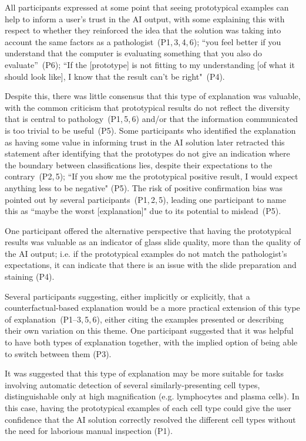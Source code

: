 \documentclass[final,5p,times,twocolumn,hyphens]{elsarticle}
\begin{document}
All participants expressed at some point that seeing prototypical examples can help to inform a user's trust in the AI output, with some explaining this with respect to whether they reinforced the idea that the solution was taking into account the same factors as a pathologist~(P1,\,3,\,4,\,6); “you feel better if you understand that the computer is evaluating something that you also do evaluate”~(P6); ``If the [prototype] is not fitting to my understanding [of what it should look like], I know that the result can't be right"~(P4). 

Despite this, there was little consensus that this type of explanation was valuable, with the common criticism that prototypical results do not reflect the diversity that is central to pathology~(P1,\,5,\,6) and/or that the information communicated is too trivial to be useful~(P5). Some participants who identified the explanation as having some value in informing trust in the AI solution later retracted this statement after identifying that the prototypes do not give an indication where the boundary between classifications lies, despite their expectations to the contrary~(P2,\,5); ``If you show me the prototypical positive result, I would expect anything less to be negative" (P5). The risk of positive confirmation bias was pointed out by several participants~(P1,\,2,\,5), leading one participant to name this as ``maybe the worst [explanation]" due to its potential to mislead~(P5).

One participant offered the alternative perspective that having the prototypical results was valuable as an indicator of glass slide quality, more than the quality of the AI output; i.e. if the prototypical examples do not match the pathologist's expectations, it can indicate that there is an issue with the slide preparation and staining (P4).

Several participants suggesting, either implicitly or explicitly, that a counterfactual-based explanation would be a more practical extension of this type of explanation~(P1--3,\,5,\,6), either citing the examples presented or describing their own variation on this theme. One participant suggested that it was helpful to have both types of explanation together, with the implied option of being able to switch between them (P3).

It was suggested that this type of explanation may be more suitable for tasks involving automatic detection of several similarly-presenting cell types, distinguishable only at high magnification (e.g. lymphocytes and plasma cells). In this case, having the prototypical examples of each cell type could give the user confidence that the AI solution  correctly resolved the different cell types without the need for laborious manual inspection (P1).
\end{document}
